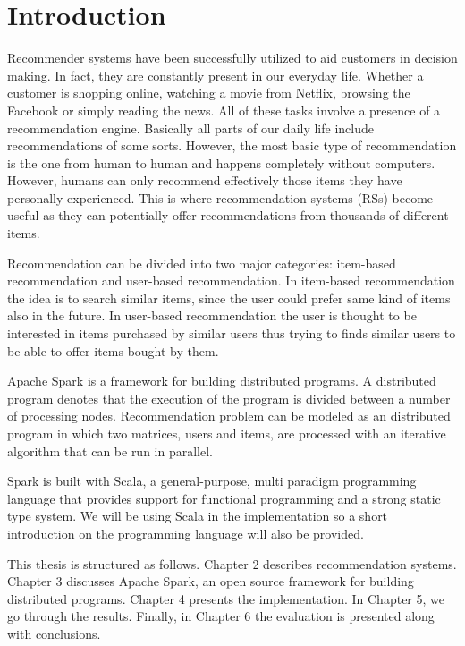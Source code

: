 \documentclass[main.tex]{thesis.tex}
\begin{document}
	
\chapter{Introduction}
\setcounter{page}{1}

Recommender systems have been successfully utilized to aid customers in decision making.
In fact, they are constantly present in our everyday life.
Whether a customer is shopping online, watching a movie from Netflix, browsing the Facebook or simply reading the news.
All of these tasks involve a presence of a recommendation engine.
Basically all parts of our daily life include recommendations of some sorts.
However, the most basic type of recommendation is the one from human to human and happens completely without computers.
However, humans can only recommend effectively those items they have personally experienced.
This is where recommendation systems (RSs) become useful as they can potentially offer recommendations from thousands of different items.

Recommendation can be divided into two major categories: item-based recommendation and user-based recommendation.
In item-based recommendation the idea is to search similar items, since the user could prefer same kind of items also in the future.
In user-based recommendation the user is thought to be interested in items purchased by similar users thus trying to finds similar users to be able to offer items bought by them.

Apache Spark is a framework for building distributed programs.
A distributed program denotes that the execution of the program is divided between a number of processing nodes.
Recommendation problem can be modeled as an distributed program in which two matrices, users and items, are processed with an iterative algorithm that can be run in parallel.

Spark is built with Scala, a general-purpose, multi paradigm programming language that provides support for functional programming and a strong static type system.
We will be using Scala in the implementation so a short introduction on the programming language will also be provided.

This thesis is structured as follows.
Chapter 2 describes recommendation systems.
Chapter 3 discusses Apache Spark, an open source framework for building distributed programs.
Chapter 4 presents the implementation.
In Chapter 5, we go through the results.
Finally, in Chapter 6 the evaluation is presented along with conclusions.
\end{document}

